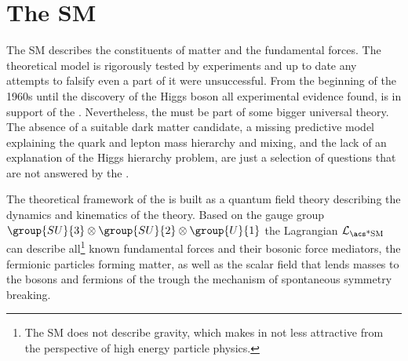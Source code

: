
\section{The \acl*{SM}}
\label{sec:cpv_theory:standard_model}

The \acf{SM} describes the constituents of matter and the fundamental forces.
The theoretical model is rigorously tested by experiments and up to date any
attempts to falsify even a part of it were unsuccessful. From the beginning of
the 1960s until the discovery of the Higgs boson \cite{Aad:2015zhl} all
experimental evidence found, is in support of the \SM. Nevertheless, the \SM
must be part of some bigger universal theory. The absence of a suitable dark
matter candidate, a missing predictive model explaining the quark and lepton
mass hierarchy and mixing, and the lack of an explanation of the Higgs hierarchy
problem, are just a selection of questions that are not answered by the \SM.

The theoretical framework of the \SM is built as a quantum field theory
describing the dynamics and kinematics of the theory. Based on the gauge group
$\group{SU}{3}\otimes\group{SU}{2}\otimes\group{U}{1}$ the \SM Lagrangian
$\mathcal{L}_{\text{\acs*{SM}}}$ can describe all\footnote{The \ac{SM} does not
describe gravity, which makes in not less attractive from the perspective of
high energy particle physics.} known fundamental forces and their bosonic force
mediators, the fermionic particles forming matter, as well as the scalar field
that lends masses to the bosons and fermions of the \SM trough the mechanism of
spontaneous symmetry breaking.

